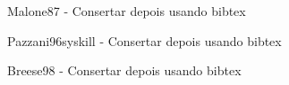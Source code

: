 \begin{thebibliography}{99}
 Malone87 - Consertar depois usando bibtex

 Pazzani96syskill - Consertar depois usando bibtex

 Breese98 - Consertar depois usando bibtex

\end{thebibliography}

